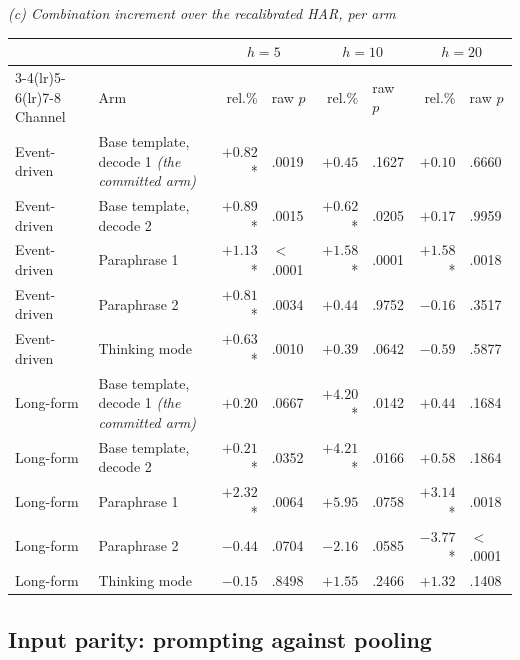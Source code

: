 \begin{table}[htbp]
\vspace{1.2ex}
\emph{(c) Combination increment over the recalibrated HAR, per arm}\\[0.4ex]
\begin{tabular}{@{}llrlrlrl@{}}
\toprule
& & \multicolumn{2}{c}{$h{=}5$} & \multicolumn{2}{c}{$h{=}10$} & \multicolumn{2}{c}{$h{=}20$} \\
\cmidrule(lr){3-4}\cmidrule(lr){5-6}\cmidrule(lr){7-8}
Channel & Arm & rel.\% & raw $p$ & rel.\% & raw $p$ & rel.\% & raw $p$ \\
\midrule
Event-driven & Base template, decode 1 \emph{(the committed arm)} & $+0.82$* & .0019 & $+0.45$\phantom{*} & .1627 & $+0.10$\phantom{*} & .6660 \\
Event-driven & Base template, decode 2 & $+0.89$* & .0015 & $+0.62$* & .0205 & $+0.17$\phantom{*} & .9959 \\
Event-driven & Paraphrase 1 & $+1.13$* & $<$.0001 & $+1.58$* & .0001 & $+1.58$* & .0018 \\
Event-driven & Paraphrase 2 & $+0.81$* & .0034 & $+0.44$\phantom{*} & .9752 & $-0.16$\phantom{*} & .3517 \\
Event-driven & Thinking mode & $+0.63$* & .0010 & $+0.39$\phantom{*} & .0642 & $-0.59$\phantom{*} & .5877 \\
\addlinespace
Long-form & Base template, decode 1 \emph{(the committed arm)} & $+0.20$\phantom{*} & .0667 & $+4.20$* & .0142 & $+0.44$\phantom{*} & .1684 \\
Long-form & Base template, decode 2 & $+0.21$* & .0352 & $+4.21$* & .0166 & $+0.58$\phantom{*} & .1864 \\
Long-form & Paraphrase 1 & $+2.32$* & .0064 & $+5.95$\phantom{*} & .0758 & $+3.14$* & .0018 \\
Long-form & Paraphrase 2 & $-0.44$\phantom{*} & .0704 & $-2.16$\phantom{*} & .0585 & $-3.77$* & $<$.0001 \\
Long-form & Thinking mode & $-0.15$\phantom{*} & .8498 & $+1.55$\phantom{*} & .2466 & $+1.32$\phantom{*} & .1408 \\
\bottomrule
\end{tabular}
\end{table}

\subsection{Input parity: prompting against pooling}


